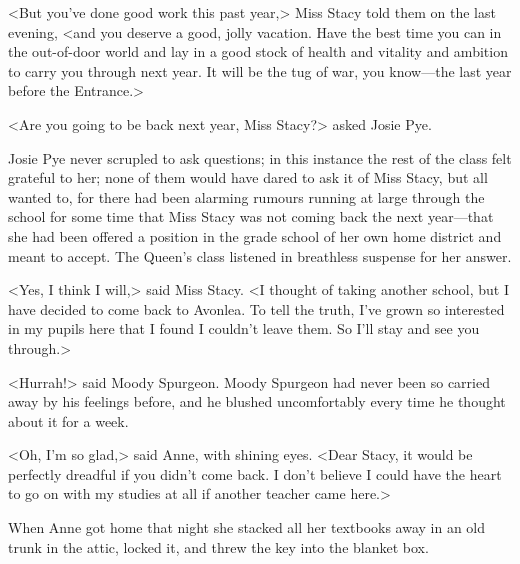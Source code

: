 <But you've done good work this past year,> Miss Stacy told them on the last evening, <and you deserve a good, jolly vacation. Have the best time you can in the out-of-door world and lay in a good stock of health and vitality and ambition to carry you through next year. It will be the tug of war, you know—the last year before the Entrance.>

<Are you going to be back next year, Miss Stacy?> asked Josie Pye.

Josie Pye never scrupled to ask questions; in this instance the rest of the class felt grateful to her; none of them would have dared to ask it of Miss Stacy, but all wanted to, for there had been alarming rumours running at large through the school for some time that Miss Stacy was not coming back the next year—that she had been offered a position in the grade school of her own home district and meant to accept. The Queen's class listened in breathless suspense for her answer.

<Yes, I think I will,> said Miss Stacy. <I thought of taking another school, but I have decided to come back to Avonlea. To tell the truth, I've grown so interested in my pupils here that I found I couldn't leave them. So I'll stay and see you through.>

<Hurrah!> said Moody Spurgeon. Moody Spurgeon had never been so carried away by his feelings before, and he blushed uncomfortably every time he thought about it for a week.

<Oh, I'm so glad,> said Anne, with shining eyes. <Dear Stacy, it would be perfectly dreadful if you didn't come back. I don't believe I could have the heart to go on with my studies at all if another teacher came here.>

When Anne got home that night she stacked all her textbooks away in an old trunk in the attic, locked it, and threw the key into the blanket box.

